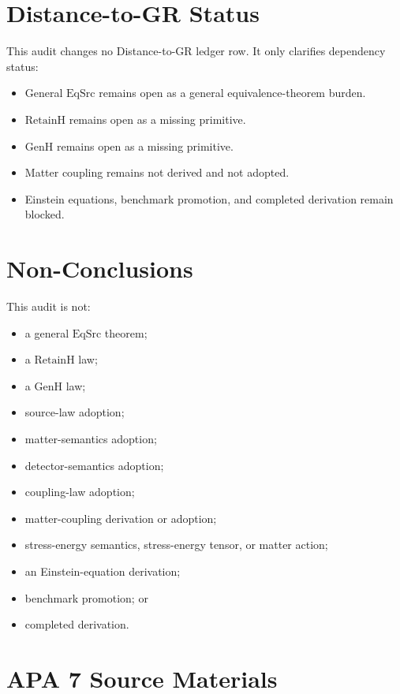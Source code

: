 \documentclass[11pt]{article}
\newcommand{\EqSrc}{\mathrm{EqSrc}}
\newcommand{\RetainH}{\mathrm{RetainH}}
\newcommand{\GenH}{\mathrm{GenH}}
\begin{document}
\section*{Distance-to-GR Status}

This audit changes no Distance-to-GR ledger row. It only clarifies dependency
status:

\begin{itemize}
\item General \(\EqSrc\) remains open as a general equivalence-theorem burden.
\item \(\RetainH\) remains open as a missing primitive.
\item \(\GenH\) remains open as a missing primitive.
\item Matter coupling remains not derived and not adopted.
\item Einstein equations, benchmark promotion, and completed derivation remain
blocked.
\end{itemize}

\section*{Non-Conclusions}

This audit is not:

\begin{itemize}
\item a general \(\EqSrc\) theorem;
\item a \(\RetainH\) law;
\item a \(\GenH\) law;
\item source-law adoption;
\item matter-semantics adoption;
\item detector-semantics adoption;
\item coupling-law adoption;
\item matter-coupling derivation or adoption;
\item stress-energy semantics, stress-energy tensor, or matter action;
\item an Einstein-equation derivation;
\item benchmark promotion; or
\item completed derivation.
\end{itemize}

\section*{APA 7 Source Materials}
\end{document}
